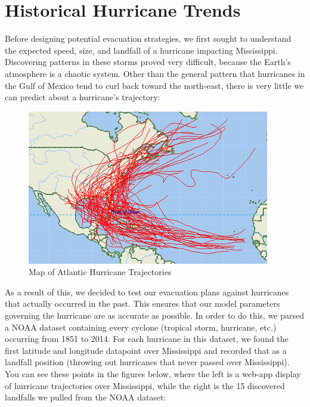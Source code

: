 \documentclass[titlepage]{article}
\begin{document}
\section{Historical Hurricane Trends}
\label{sec:hurricanes}
  Before designing potential evacuation strategies, we first sought to understand the expected speed, size, and landfall of a hurricane impacting Mississippi. Discovering patterns in these storms proved very difficult, because the Earth's atmosphere is a chaotic system. Other than the general pattern that hurricanes in the Gulf of Mexico tend to curl back toward the north-east, there is very little we can predict about a hurricane's trajectory:
   \begin{figure}[H]
    \centering
      \includegraphics[width=.5\textwidth]{figures/chaos.jpg}
      \caption{Map of Atlantic Hurricane Trajectories \cite{chaos}}
    \end{figure}
  As a result of this, we decided to test our evacuation plans against hurricanes that actually occurred in the past. This ensures that our model parameters governing the hurricane are as accurate as possible. In order to do this, we parsed a NOAA dataset containing every cyclone (tropical storm, hurricane, etc.) occurring from 1851 to 2014. For each hurricane in this dataset, we found the first latitude and longitude datapoint over Mississippi and recorded that as a landfall position (throwing out hurricanes that never passed over Mississippi). You can see these points in the figures below, where the left is a web-app display of hurricane trajectories over Mississippi, while the right is the 15 discovered landfalls we pulled from the NOAA dataset:
\end{document}
